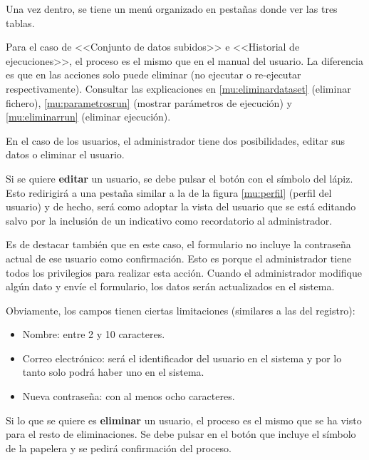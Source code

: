 Una vez dentro, se tiene un menú organizado en pestañas donde ver las tres tablas.




Para el caso de <<Conjunto de datos subidos>> e <<Historial de ejecuciones>>, el
proceso es el mismo que en el manual del usuario. La diferencia es que en las
acciones solo puede eliminar (no ejecutar o re-ejecutar respectivamente).
Consultar las explicaciones  en \ref{mu:eliminardataset} (eliminar fichero),
\ref{mu:parametrosrun} (mostrar parámetros de ejecución) y \ref{mu:eliminarrun}
(eliminar ejecución).

En el caso de los usuarios, el administrador tiene dos posibilidades, editar sus
datos o eliminar el usuario.

Si se quiere \textbf{editar} un usuario, se debe pulsar el botón con el símbolo
del lápiz. Esto redirigirá a una pestaña similar a la de la figura
\ref{mu:perfil} (perfil del usuario) y de hecho, será como adoptar la vista del
usuario que se está editando salvo por la inclusión de un indicativo como
recordatorio al administrador.


Es de destacar también que en este caso, el formulario no incluye la contraseña
actual de ese usuario como confirmación. Esto es porque el administrador tiene
todos los privilegios para realizar esta acción. Cuando el administrador
modifique algún dato y envíe el formulario, los datos serán actualizados en el
sistema. 

Obviamente, los campos tienen ciertas limitaciones (similares a las del
registro):
\begin{itemize}
    \item Nombre: entre 2 y 10 caracteres.
    \item Correo electrónico: será el identificador del usuario en el sistema y
    por lo tanto solo podrá haber uno en el sistema.
    \item Nueva contraseña: con al menos ocho caracteres.
\end{itemize}

Si lo que se quiere es \textbf{eliminar} un usuario, el proceso es el mismo que
se ha visto para el resto de eliminaciones. Se debe pulsar en el botón que
incluye el símbolo de la papelera y se pedirá confirmación del proceso.

